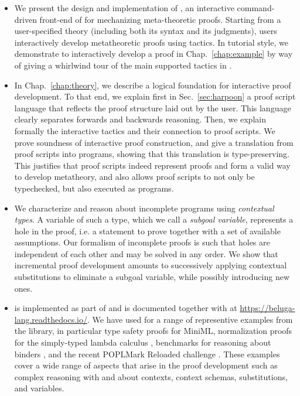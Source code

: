 \begin{itemize}
\item
  We present the design and implementation of \Harpoon, an
  interactive command-driven front-end of \Beluga{} for mechanizing
  meta-theoretic proofs.
  Starting from a user-specified theory (including both its syntax and its
  judgments), users interactively develop metatheoretic proofs using tactics.
  In tutorial style, we demonstrate \Harpoon{} to interactively
  develop a proof in Chap.~\ref{chap:example} by way of giving a whirlwind tour of
  the main supported tactics in \Harpoon.

\item
  In Chap.~\ref{chap:theory}, we describe a logical foundation for interactive
  proof development. To that end, we explain first in Sec.~\ref{sec:harpoon} a
  proof script language that reflects the proof structure laid out by the
  user. This language clearly separates forwards and backwards reasoning.
  Then, we explain formally the interactive tactics and their connection to proof
  scripts. We prove soundness of interactive proof construction, and give a
  translation from proof scripts into \Beluga{} programs, showing that this
  translation is type-preserving.
  This justifies that proof scripts indeed represent proofs and form a valid way
  to develop metatheory, and also allows proof scripts to not only be
  typechecked, but also executed as programs.

\item
  We characterize and reason about incomplete programs using
  \emph{contextual types}.
  A variable of such a type, which we call a \emph{subgoal variable}, represents a
  hole in the proof, i.e. a statement to prove together with a set of available
  assumptions.
  Our formalism of incomplete proofs is such that holes are independent of each
  other and may be solved in any order.
  We show that incremental proof development amounts to successively applying
  contextual substitutions to eliminate a subgoal variable, while possibly
  introducing new ones.

\item
  \Harpoon{} is implemented as part of \Beluga{} and is documented together with
  \Beluga{} at \url{https://beluga-lang.readthedocs.io/}.
  We have used \Harpoon{} for a range of representive examples from the
  \Beluga{} library, in particular type safety proofs for
  MiniML, normalization proofs for the simply-typed lambda calculus
  \cite{Cave:MSCS18},
  benchmarks for reasoning about binders
  \cite{Felty:MSCS17,Felty:orbi-survey},
  and the recent POPLMark Reloaded challenge \cite{POPLMarkReloaded:19}.
  These examples cover a wide range of aspects that arise in the
  proof development such as complex reasoning with and about contexts,
  context schemas, substitutions, and variables.
\end{itemize}

